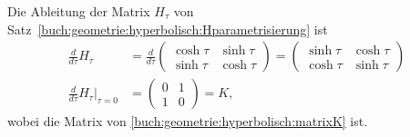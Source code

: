 Die Ableitung der Matrix $H_{\tau}$ von 
Satz~\ref{buch:geometrie:hyperbolisch:Hparametrisierung} ist
\begin{align*}
\frac{d}{d\tau} H_{\tau}
&=
\frac{d}{d\tau}
\begin{pmatrix}
\cosh\tau & \sinh\tau\\
\sinh\tau & \cosh\tau
\end{pmatrix}
=
\begin{pmatrix}
\sinh\tau & \cosh\tau\\
\cosh\tau & \sinh\tau
\end{pmatrix}
\\
\frac{d}{d\tau} H_{\tau}
\bigg|_{\tau=0}
&=
\begin{pmatrix}
0&1\\
1&0
\end{pmatrix}
=
K,
\end{align*}
wobei die Matrix von \eqref{buch:geometrie:hyperbolisch:matrixK} ist.




